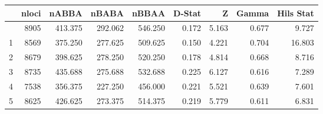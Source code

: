 \documentclass[preview]{standalone}
\begin{document}
\begin{tabular}{lrrrrrrrr}
\toprule
{} &  nloci &    nABBA &    nBABA &    nBBAA &  D-Stat &      Z &  Gamma &  Hils Stat \\
\midrule
\sloppy
0 &   8905 &  413.375 &  292.062 &  546.250 &   0.172 &  5.163 &  0.677 &      9.727 \\
1 &   8569 &  375.250 &  277.625 &  509.625 &   0.150 &  4.221 &  0.704 &     16.803 \\
2 &   8679 &  398.625 &  278.250 &  520.250 &   0.178 &  4.814 &  0.668 &      8.716 \\
3 &   8735 &  435.688 &  275.688 &  532.688 &   0.225 &  6.127 &  0.616 &      7.289 \\
4 &   7538 &  356.375 &  227.250 &  456.000 &   0.221 &  5.521 &  0.639 &      7.601 \\
5 &   8625 &  426.625 &  273.375 &  514.375 &   0.219 &  5.779 &  0.611 &      6.831 \\
\bottomrule
\end{tabular}
\end{document}
